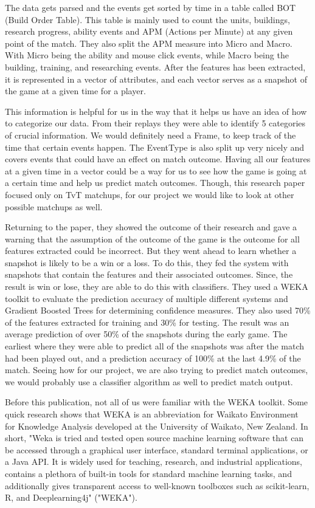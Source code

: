 \documentclass[a4paper,12pt]{report}
\begin{document}
The data gets parsed and the events get sorted by time in a table called BOT (Build Order Table). This table is mainly used to count the units, buildings, research progress, ability events and APM (Actions per Minute) at any given point of the match. They also split the APM measure into Micro and Macro. With Micro being the ability and mouse click events, while Macro being the building, training, and researching events. After the features has been extracted, it is represented in a vector of attributes, and each vector serves as a snapshot of the game at a given time for a player.

This information is helpful for us in the way that it helps us have an idea of how to categorize our data. From their replays they were able to identify 5 categories of crucial information. We would definitely need a Frame, to keep track of the time that certain events happen. The EventType is also split up very nicely and covers events that could have an effect on match outcome. Having all our features at a given time in a vector could be a way for us to see how the game is going at a certain time and help us predict match outcomes. Though, this research paper focused only on TvT matchups, for our project we would like to look at other possible matchups as well.

Returning to the paper, they showed the outcome of their research and gave a warning that the assumption of the outcome of the game is the outcome for all features extracted could be incorrect. But they went ahead to learn whether a snapshot is likely to be a win or a loss. To do this, they fed the system with snapshots that contain the features and their associated outcomes. Since, the result is win or lose, they are able to do this with classifiers. They used a WEKA toolkit to evaluate the prediction accuracy of multiple different systems and Gradient Boosted Trees for determining confidence measures. They also used 70\% of the features extracted for training and 30\% for testing. The result was an average prediction of over 50\% of the snapshots during the early game. The earliest where they were able to predict all of the snapshots was after the match had been played out, and a prediction accuracy of 100\% at the last 4.9\% of the match.
Seeing how for our project, we are also trying to predict match outcomes, we would probably use a classifier algorithm as well to predict match output.

Before this publication, not all of us were familiar with the WEKA toolkit. Some quick research shows that WEKA is an abbreviation for Waikato Environment for Knowledge Analysis developed at the University of Waikato, New Zealand. In short, "Weka is tried and tested open source machine learning software that can be accessed through a graphical user interface, standard terminal applications, or a Java API. It is widely used for teaching, research, and industrial applications, contains a plethora of built-in tools for standard machine learning tasks, and additionally gives transparent access to well-known toolboxes such as scikit-learn, R, and Deeplearning4j" ("WEKA"). 
\end{document}
